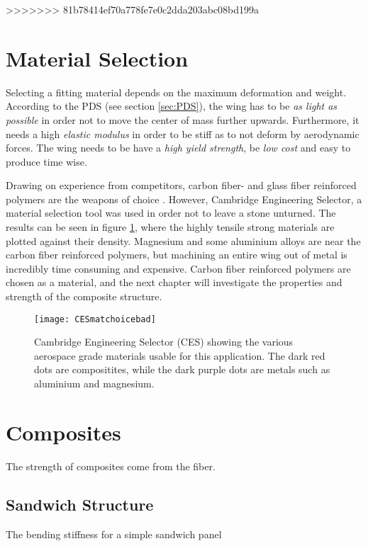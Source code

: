 >>>>>>> 81b78414ef70a778fe7e0c2dda203abc08bd199a
\section{Material Selection}

  Selecting a fitting material depends on the maximum deformation and weight. According to the PDS (see section \ref{sec:PDS}), the wing has to be \emph{as light as possible} in order not to move the center of mass further upwards. Furthermore, it needs a high \emph{elastic modulus} in order to be stiff as to not deform by aerodynamic forces. The wing needs to be have a \emph{high yield strength}, be \emph{low cost} and easy to produce time wise.

  Drawing on experience from competitors, carbon fiber- and glass fiber reinforced polymers are the weapons of choice \cite{FSwingmaterial}. However, Cambridge Engineering Selector, a material selection tool was used in order not to leave a stone unturned. The results can be seen in figure \ref{fig:CESmatchoice}, where the highly tensile strong materials are plotted against their density. Magnesium and some aluminium alloys are near the carbon fiber reinforced polymers, but machining an entire wing out of metal is incredibly time consuming and expensive. Carbon fiber reinforced polymers are chosen as a material, and the next chapter will investigate the properties and strength of the composite structure.

  \begin{figure}
    \texttt{[image: CESmatchoicebad]}
    \caption{Cambridge Engineering Selector (CES) showing the various aerospace grade materials usable for this application. The dark red dots are compositites, while the dark purple dots are metals such as aluminium and magnesium.}
    \label{fig:CESmatchoice}
  \end{figure}

\section{Composites}

  The strength of composites come from the fiber.

  \subsection{Sandwich Structure}

    The bending stiffness for a simple sandwich panel

